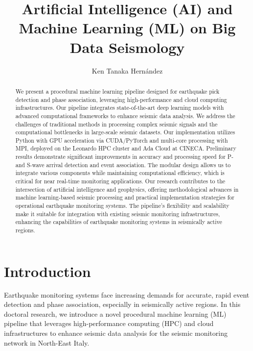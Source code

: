 \documentclass{llncs}
\begin{document}
\title{Artificial Intelligence (AI) and Machine Learning (ML) on Big Data 
Seismology \cite{PhD}}
\author{Ken Tanaka Hernández}

\maketitle

\begin{abstract}
We present a procedural machine learning pipeline designed for earthquake pick 
detection and phase association, leveraging high-performance and cloud 
computing infrastructures. Our pipeline integrates state-of-the-art deep 
learning models with advanced computational frameworks to enhance seismic data 
analysis. We address the challenges of traditional methods in processing 
complex seismic signals and the computational bottlenecks in large-scale 
seismic datasets. Our implementation utilizes Python with GPU acceleration via 
CUDA/PyTorch and multi-core processing with MPI, deployed on the Leonardo HPC 
cluster and Ada Cloud at CINECA. Preliminary results demonstrate significant 
improvements in accuracy and processing speed for P- and S-wave arrival 
detection and event association. The modular design allows us to integrate 
various components while maintaining computational efficiency, which is 
critical for near real-time monitoring applications. Our research contributes 
to the intersection of artificial intelligence and geophysics, offering 
methodological advances in machine learning-based seismic processing and 
practical implementation strategies for operational earthquake monitoring 
systems. The pipeline's flexibility and scalability make it suitable for 
integration with existing seismic monitoring infrastructures, enhancing the 
capabilities of earthquake monitoring systems in seismically active regions.
\end{abstract}


\section{Introduction}
Earthquake monitoring systems face increasing demands for accurate, rapid event
detection and phase association, especially in seismically active regions. In 
this doctoral research, we introduce a novel procedural machine learning (ML)
pipeline that leverages high-performance computing (HPC) and cloud 
infrastructures to enhance seismic data analysis for the seismic monitoring 
network in North-East Italy.
\end{document}
